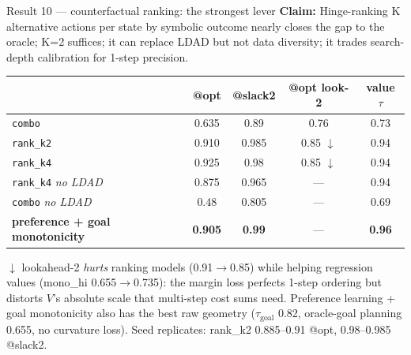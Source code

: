 \documentclass[aspectratio=169,10pt]{beamer}
\newcommand{\claim}[1]{\textcolor{cviolet}{\textbf{Claim:} #1}}
\begin{document}
\begin{frame}{Result 10 --- counterfactual ranking: the strongest lever}
\claim{Hinge-ranking K alternative actions per state by symbolic outcome
nearly closes the gap to the oracle; K=2 suffices; it can replace LDAD but
not data diversity; it trades search-depth calibration for 1-step precision.}
\centering\small
\begin{tabular}{lcccc}
\toprule
 & @opt & @slack2 & @opt look-2 & value $\tau$ \\
\midrule
\texttt{combo} & 0.635 & 0.89 & 0.76 & 0.73\\
\texttt{rank\_k2} & 0.910 & 0.985 & 0.85 $\downarrow$ & 0.94\\
\texttt{rank\_k4} & 0.925 & 0.98 & 0.85 $\downarrow$ & 0.94\\
\texttt{rank\_k4} \emph{no LDAD} & 0.875 & 0.965 & --- & 0.94\\
\texttt{combo} \emph{no LDAD} & 0.48 & 0.805 & --- & 0.69\\
\textbf{preference + goal monotonicity} & \textbf{0.905} & \textbf{0.99}
 & --- & \textbf{0.96}\\
\bottomrule
\end{tabular}

\medskip\small
$\downarrow$ lookahead-2 \emph{hurts} ranking models (0.91$\to$0.85) while
helping regression values (mono\_hi 0.655$\to$0.735): the margin loss
perfects 1-step ordering but distorts $V$'s absolute scale that multi-step
cost sums need. Preference learning + goal monotonicity also has the best raw geometry
($\tau_{\text{goal}}$ 0.82, oracle-goal planning 0.655, no curvature loss).
Seed replicates: rank\_k2 0.885--0.91 @opt, 0.98--0.985 @slack2.
\end{frame}
\end{document}
